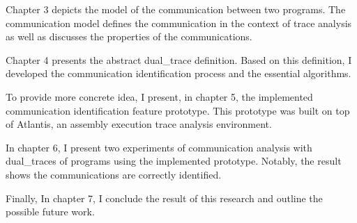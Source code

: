 Chapter 3 depicts the model of the communication between two programs. The communication model defines the communication in the context of trace analysis as well as discusses the properties of the communications. 

Chapter 4 presents the abstract dual\_trace definition. Based on this definition, I developed the communication identification process and the essential algorithms.

To provide more concrete idea, I present, in chapter 5, the implemented communication identification feature prototype. This prototype was built on top of Atlantis\cite{huang2017atlantis}, an assembly execution trace analysis environment.

In chapter 6, I present two experiments of communication analysis with dual\_traces of programs using the implemented prototype. Notably, the result shows the communications are correctly identified. 

Finally, In chapter 7, I conclude the result of this research and outline the possible future work.